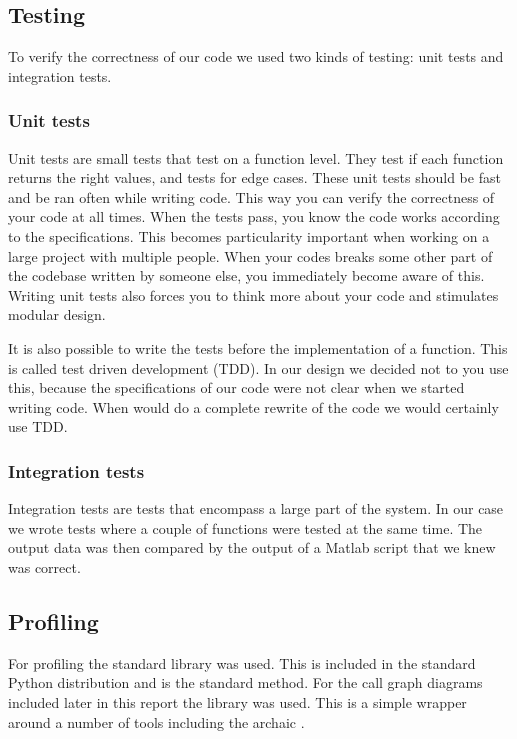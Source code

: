 \documentclass[a4paper, openany, oneside]{memoir}
\begin{document}
\subsection{Testing}
\label{sec:testing}
To verify the correctness of our code we used two kinds of testing: unit tests and integration tests.

\subsubsection{Unit tests}
Unit tests are small tests that test on a function level. They test if each function returns the right values, and tests for edge cases. These unit tests should be fast and be ran often while writing code. This way you can verify the correctness of your code at all times. When the tests pass, you know the code works according to the specifications. This becomes particularity important when working on a large project with multiple people. When your codes breaks some other part of the codebase written by someone else, you immediately become aware of this. Writing unit tests also forces you to think more about your code and stimulates modular design.

It is also possible to write the tests before the implementation of a function. This is called test driven development (TDD). In our design we decided not to you use this, because the specifications of our code were not clear when we started writing code. When would do a complete rewrite of the code we would certainly use TDD.

\subsubsection{Integration tests}
Integration tests are tests that encompass a large part of the system. In our case we wrote tests where a couple of functions were tested at the same time. The output data was then compared by the output of a Matlab script that we knew was correct.


\subsection{Profiling}
\label{sec:profiling}
For profiling the standard  library was used. This is included in the standard Python distribution and is the standard method. For the call graph diagrams included later in this report the library  was used. This is a simple wrapper around a number of tools including the archaic .
\end{document}
